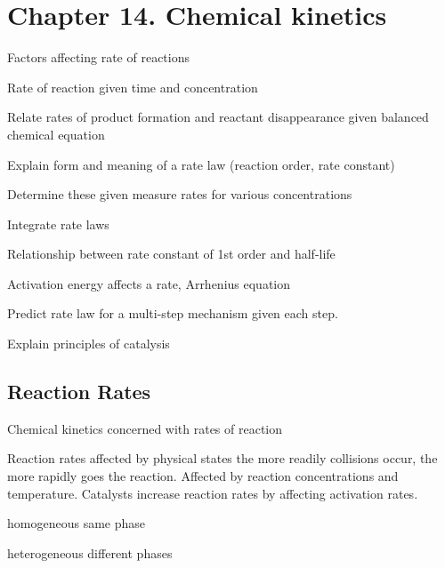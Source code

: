 \section{Chapter 14. Chemical kinetics}


\secttoc

{\footnotesize
\begin{multicols}{3}
\begin{compactenum}
    \item Factors affecting rate of reactions
    \item Rate of reaction given time and concentration
    \item Relate rates of product formation and reactant disappearance given
        balanced chemical equation
    \item Explain form and meaning of a rate law (reaction order, rate constant)
    \item Determine these given measure rates for various concentrations
    \item Integrate rate laws
    \item Relationship between rate constant of 1st order and half-life
    \item Activation energy affects a rate, Arrhenius equation
    \item Predict rate law for a multi-step mechanism given each step.
    \item Explain principles of catalysis
\end{compactenum}
\end{multicols}
}

\begin{mdframed}\subsection{Reaction Rates}
\begin{multicols}{2}
\begin{compactdesc}
    \item[Chemical kinetics] concerned with rates of reaction
    \item[Reaction rates] affected by physical states
        the more readily collisions occur, the more rapidly goes the reaction.
        Affected by reaction concentrations and temperature. Catalysts increase
        reaction rates by affecting activation rates.
    \item[homogeneous] same phase
    \item[heterogeneous] different phases
\end{compactdesc}
\end{multicols}
\end{mdframed}


